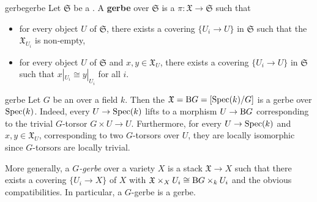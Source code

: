 \begin{topic}{gerbe}{gerbe}
    Let $\mathfrak{S}$ be a . A \textbf{gerbe} over $\mathfrak{S}$ is a  $\pi \colon \mathfrak{X} \to \mathfrak{S}$ such that
    \begin{itemize}
        \item for every object $U$ of $\mathfrak{S}$, there exists a covering $\{ U_i \to U \}$ in $\mathfrak{S}$ such that the  $\mathfrak{X}_{U_i}$ is non-empty,
        \item for every object $U$ of $\mathfrak{S}$ and $x, y \in \mathfrak{X}_U$, there exists a covering $\{ U_i \to U \}$ in $\mathfrak{S}$ such that $x|_{U_i} \cong y|_{U_i}$ for all $i$.
    \end{itemize}
\end{topic}

\begin{example}{gerbe}
    Let $G$ be an  over a field $k$. Then the  $\mathfrak{X} = \textup{B} G = [\operatorname{Spec}(k) / G]$ is a gerbe over $\operatorname{Spec}(k)$. Indeed, every $U \to \operatorname{Spec}(k)$ lifts to a morphism $U \to \textup{B} G$ corresponding to the trivial $G$-torsor $G \times U \to U$. Furthermore, for every $U \to \operatorname{Spec}(k)$ and $x, y \in \mathfrak{X}_{U}$, corresponding to two $G$-torsors over $U$, they are locally isomorphic since $G$-torsors are locally trivial.
    
    More generally, a \textit{$G$-gerbe} over a variety $X$ is a stack $\mathfrak{X} \to X$ such that there exists a covering $\{ U_i \to X \}$ of $X$ with $\mathfrak{X} \times_X U_i \cong \textup{B} G \times_k U_i$ and the obvious compatibilities. In particular, a $G$-gerbe is a gerbe.
\end{example}
